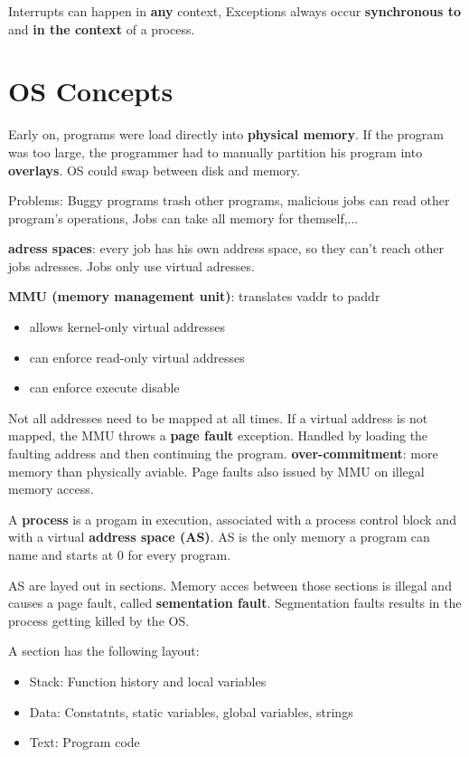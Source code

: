 \documentclass[11pt,a4paper]{article}
\begin{document}
	Interrupts can happen in \textbf{any} context, Exceptions always occur \textbf{synchronous to} and \textbf{in the context} of a process.
	
	\section{OS Concepts}
	
	Early on, programs were load directly into \textbf{physical memory}. If the program was too large, the  programmer had to manually partition his program into \textbf{overlays}. OS could swap between disk and memory.
	
	Problems: Buggy programs trash other programs, malicious jobs can read other program's operations, Jobs can take all memory for themself,...
	
	\textbf{adress spaces}: every job has his own address space, so they can't reach other jobs adresses. Jobs only use virtual adresses. \newline
	
	\textbf{MMU (memory management unit)}: translates \gls{vaddr} to \gls{paddr}
	
	\begin{itemize}
		\item allows kernel-only virtual addresses
		\item can enforce read-only virtual addresses
		\item can enforce execute disable
	\end{itemize}
	
	Not all addresses need to be mapped at all times. If a virtual address is not mapped, the MMU throws a \textbf{page fault} exception. Handled by loading the faulting address and then continuing the program. \textbf{over-commitment}: more memory than physically aviable. Page faults also issued by MMU on illegal memory access.
	
	A \textbf{process} is a progam in execution, associated with a \gls{process control block} and with a virtual \textbf{address space (AS)}. AS is the only memory a program can name and starts at 0 for every program.
	
	AS are layed out in sections. Memory acces between those sections is illegal and causes a page fault, called \textbf{sementation fault}. Segmentation faults results in the process getting killed by the OS.
	
	A section has the following layout:
	\begin{itemize}
		\item Stack: Function history and local variables
		\item Data: Constatnts, static variables, global variables, strings
		\item Text: Program code
	\end{itemize}
	
\end{document}
